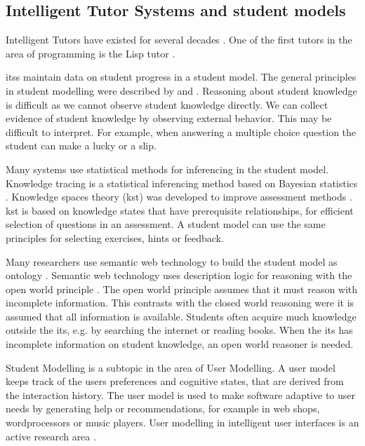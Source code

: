 \subsection{Intelligent Tutor Systems and student models}
Intelligent Tutors have existed for several decades \citep{woolf_2010}. 
One of the first tutors in the area of programming is the Lisp tutor \citep{anderson1986}.

\glspl{its} maintain data on student progress in a student model. 
The general principles in student modelling were described by \citet{studentModelling} and  \citet{brusilovskiy_1993, brusilovsky_1994}.
Reasoning about student knowledge is difficult as we cannot observe student knowledge directly.
We can collect evidence of student knowledge by observing external behavior.
This may be difficult to interpret. For example, when answering a multiple choice question the student can make a \gls{lucky} or a \gls{slip}.

Many systems use statistical methods for inferencing in the student model. 
Knowledge tracing is a statistical inferencing method based on Bayesian statistics   \citep{corbett_1995}.
Knowledge spaces theory (\gls{kst}) was developed to improve assessment methods  \citep{doignon_falmagne_2016}. 
\gls{kst} is based on knowledge states that have prerequisite relationships, for efficient selection of questions in an assessment.
A student model can use the same principles for selecting exercises, hints or feedback.

Many researchers use semantic web technology to build the student model as ontology \citep{ontology}.
Semantic web technology uses description logic for reasoning with the open world principle \citep{dl2007}. 
The open world principle assumes that it must reason with incomplete information.
This contrasts with the closed world reasoning were it is assumed that all information is available.
Students often acquire much knowledge outside the \gls{its}, e.g. by searching the internet or reading books. 
When the \gls{its} has incomplete information on student knowledge, an open world reasoner is needed.


Student Modelling is a subtopic in the area of User Modelling.
A user model keeps track of the users preferences and cognitive states, that are derived from the interaction history.
The user model is used to make software adaptive to user needs by generating help or recommendations, for example in web shops, wordprocessors or music players.
User modelling in intelligent user interfaces is an active research area \citep{Brusilovsky2007}.

